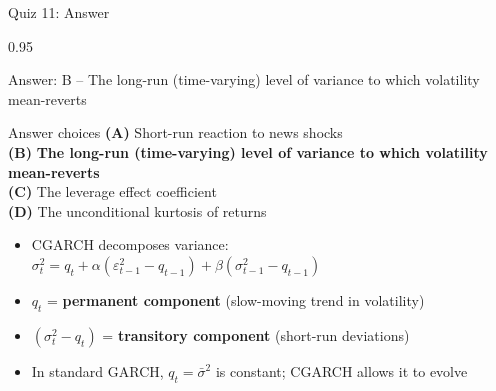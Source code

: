 \documentclass[9pt, aspectratio=169, t]{beamer}
\begin{document}
\begin{frame}{Quiz 11: Answer}
    \begin{cminipage}{0.95\textwidth}
    {\small
    \begin{exampleblock}{Answer: B -- The long-run (time-varying) level of variance to which volatility mean-reverts}

    \vspace{0.1cm}

    \begin{block}{Answer choices}
        \textcolor{MainBlue}{\textbf{(A)}} Short-run reaction to news shocks \incorrect\\[2pt]
        \textcolor{MainBlue}{\textbf{(B)}} \textbf{\textcolor{Forest}{The long-run (time-varying) level of variance to which volatility mean-reverts}} \correct\\[2pt]
        \textcolor{MainBlue}{\textbf{(C)}} The leverage effect coefficient \incorrect\\[2pt]
        \textcolor{MainBlue}{\textbf{(D)}} The unconditional kurtosis of returns \incorrect
    \end{block}

        \vspace{0.1cm}

        \begin{itemize}\setlength{\itemsep}{0pt}
            \item CGARCH decomposes variance: $\sigma_t^2 = q_t + \alpha(\varepsilon_{t-1}^2 - q_{t-1}) + \beta(\sigma_{t-1}^2 - q_{t-1})$
            \item $q_t$ = \textbf{permanent component} (slow-moving trend in volatility)
            \item $(\sigma_t^2 - q_t)$ = \textbf{transitory component} (short-run deviations)
            \item In standard GARCH, $q_t = \bar{\sigma}^2$ is constant; CGARCH allows it to evolve
        \end{itemize}
    \end{exampleblock}
    }

    \end{cminipage}
\end{frame}
\end{document}
